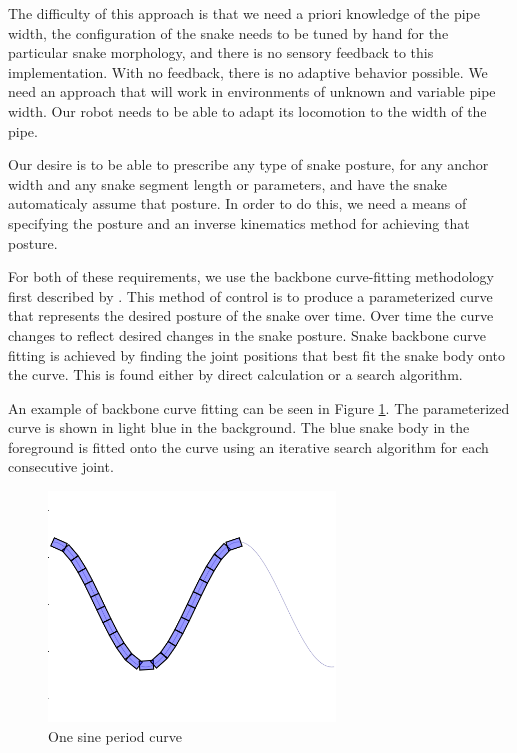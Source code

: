 The difficulty of this approach is that we need a priori knowledge of the pipe width, the configuration of the snake needs to be tuned by hand for the particular snake morphology, and there is no sensory feedback to this implementation.   With no feedback, there is no adaptive behavior possible.   We need an approach that will work in environments of unknown and variable pipe width.   Our robot needs to be able to adapt its locomotion to the width of the pipe.

Our desire is to be able to prescribe any type of snake posture, for any anchor width and any snake segment length or parameters, and have the snake automaticaly assume that posture.  In order to do this, we need a means of specifying the posture and an inverse kinematics method for achieving that posture.

For both of these requirements, we use the backbone curve-fitting methodology first described by \cite{Chirikijan:1995p774}.  This method of control is to produce a parameterized curve that represents the desired posture of the snake over time. Over time the curve changes to reflect desired changes in the snake posture. Snake backbone curve fitting is achieved by finding the joint positions that best fit the snake body onto the curve. This is found either by direct calculation or a search algorithm.

An example of backbone curve fitting can be seen in Figure \ref{onePeriod}.   The parameterized curve is shown in light blue in the background.   The blue snake body in the foreground is fitted onto the curve using an iterative search algorithm for each consecutive joint. 

\begin{figure}
  \begin{center}
    \includegraphics[width=3in]{OnePeriodCurve.png}
  \end{center}
  \caption{One sine period curve}
	\label{onePeriod}
\end{figure}

